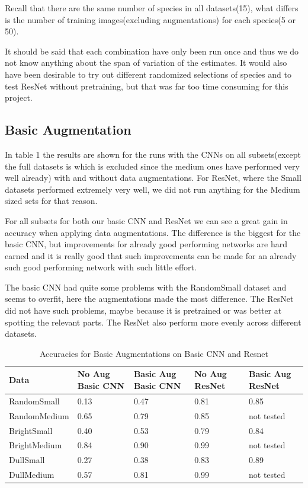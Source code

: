 \documentclass{article}
\begin{document}
Recall that there are the same number of species in all datasets(15), what differs is the number of training images(excluding augmentations) for each species(5 or 50).

It should be said that each combination have only been run once and thus we do not know anything about the span of variation of the estimates. It would also have been desirable to try out different randomized selections of species and to test ResNet without pretraining, but that was far too time consuming for this project.

\subsection{Basic Augmentation}
In table 1 the results are shown for the runs with the CNNs on all subsets(except the full datasets is which is excluded since the medium ones have performed very well already) with and without data augmentations. For ResNet, where the Small datasets performed extremely very well, we did not run anything for the Medium sized sets for that reason. 

For all subsets for both our basic CNN and ResNet we can see a great gain in accuracy when applying data augmentations. The difference is the biggest for the basic CNN, but improvements for already good performing networks are hard earned and it is really good that such improvements can be made for an already such good performing network with such little effort. 

The basic CNN had quite some problems with the RandomSmall dataset and seems to overfit, here the augmentations made the most difference. The ResNet did not have such problems, maybe because it is pretrained or was better at spotting the relevant parts. The ResNet also perform more evenly across different datasets. 


\begin{table}[H]
	\caption{Accuracies for Basic Augmentations on Basic CNN and Resnet}
	\label{sample-table}
	\centering
	\begin{tabular}{lllll}
		\toprule
		Data & No Aug Basic CNN & Basic Aug Basic CNN & No Aug ResNet &Basic Aug ResNet\\
		\midrule
		RandomSmall  & 0.13 & 0.47 & 0.81 & 0.85 \\
		RandomMedium & 0.65 & 0.79 & 0.85 & not tested     \\
		BrightSmall  & 0.40 & 0.53 & 0.79 & 0.84 \\
		BrightMedium & 0.84 & 0.90 & 0.99 & not tested     \\
		DullSmall    & 0.27 & 0.38 & 0.83 & 0.89 \\
		DullMedium   & 0.57 & 0.81 & 0.99 & not tested     \\
		\bottomrule
	\end{tabular}
\end{table}
\end{document}

